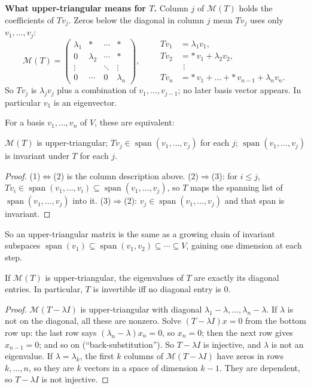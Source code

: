 \documentclass[10pt]{scrartcl}
\DeclareMathOperator{\spn}{span}
\newcommand{\MM}{\mathcal M}
\begin{document}
\textbf{What upper-triangular means for $T$.} Column $j$ of $\MM(T)$ holds the coefficients of $Tv_j$. Zeros below the diagonal in column $j$ mean $Tv_j$ uses only $v_1,\dots,v_j$:
\[
\MM(T)=\begin{pmatrix}
\lambda_1&*&\cdots&*\\
0&\lambda_2&\cdots&*\\
\vdots&&\ddots&\vdots\\
0&\cdots&0&\lambda_n
\end{pmatrix},
\qquad
\begin{aligned}
Tv_1&=\lambda_1v_1,\\
Tv_2&=*\,v_1+\lambda_2v_2,\\
&\ \,\vdots\\
Tv_n&=*\,v_1+\dots+*\,v_{n-1}+\lambda_nv_n.
\end{aligned}
\]
So $Tv_j$ is $\lambda_jv_j$ plus a combination of $v_1,\dots,v_{j-1}$; no later basis vector appears. In particular $v_1$ is an eigenvector.

\begin{proposition*}
  For a basis $v_1,\dots,v_n$ of $V$, these are equivalent:
  \begin{enumerate}
    \ii $\MM(T)$ is upper-triangular;
    \ii $Tv_j\in\spn(v_1,\dots,v_j)$ for each $j$;
    \ii $\spn(v_1,\dots,v_j)$ is invariant under $T$ for each $j$.
  \end{enumerate}
\end{proposition*}
\begin{proof}
  (1)$\Leftrightarrow$(2) is the column description above. (2)$\Rightarrow$(3): for $i\le j$, $Tv_i\in\spn(v_1,\dots,v_i)\subseteq\spn(v_1,\dots,v_j)$, so $T$ maps the spanning list of $\spn(v_1,\dots,v_j)$ into it. (3)$\Rightarrow$(2): $v_j\in\spn(v_1,\dots,v_j)$ and that span is invariant.
\end{proof}
So an upper-triangular matrix is the same as a growing chain of invariant subspaces $\spn(v_1)\subseteq\spn(v_1,v_2)\subseteq\cdots\subseteq V$, gaining one dimension at each step.

\begin{proposition*}
  If $\MM(T)$ is upper-triangular, the eigenvalues of $T$ are exactly its diagonal entries. In particular, $T$ is invertible iff no diagonal entry is $0$.
\end{proposition*}
\begin{proof}
  $\MM(T-\lambda I)$ is upper-triangular with diagonal $\lambda_1-\lambda,\dots,\lambda_n-\lambda$.
  If $\lambda$ is not on the diagonal, all these are nonzero. Solve $(T-\lambda I)x=0$ from the bottom row up: the last row says $(\lambda_n-\lambda)x_n=0$, so $x_n=0$; then the next row gives $x_{n-1}=0$; and so on (``back-substitution''). So $T-\lambda I$ is injective, and $\lambda$ is not an eigenvalue.
  If $\lambda=\lambda_k$, the first $k$ columns of $\MM(T-\lambda I)$ have zeros in rows $k,\dots,n$, so they are $k$ vectors in a space of dimension $k-1$. They are dependent, so $T-\lambda I$ is not injective.
\end{proof}
\end{document}
